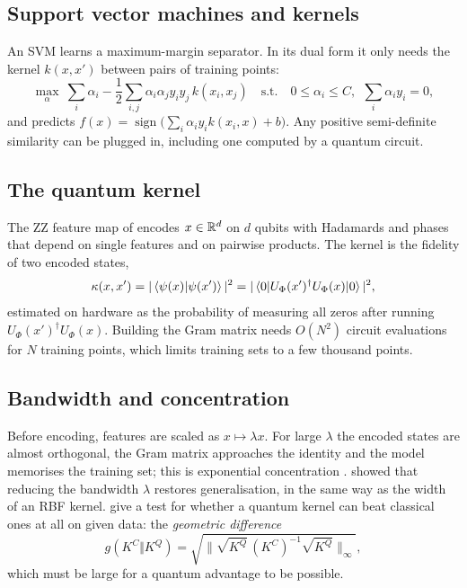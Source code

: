 \documentclass[11pt,a4paper]{article}
\begin{document}
\subsection{Support vector machines and kernels}
An SVM \citep{cortes1995} learns a maximum-margin separator. In its dual form it only needs the
kernel $k(x,x')$ between pairs of training points:
\begin{equation}
  \max_{\alpha}\ \sum_i\alpha_i-\frac12\sum_{i,j}\alpha_i\alpha_jy_iy_j\,k(x_i,x_j)
  \quad\text{s.t.}\quad 0\le\alpha_i\le C,\ \ \sum_i\alpha_iy_i=0,
\end{equation}
and predicts $f(x)=\operatorname{sign}\big(\sum_i\alpha_iy_ik(x_i,x)+b\big)$. Any positive
semi-definite similarity can be plugged in, including one computed by a quantum circuit.

\subsection{The quantum kernel}
The ZZ feature map of \citet{havlicek2019} encodes $x\in\mathbb{R}^d$ on $d$ qubits with Hadamards and
phases that depend on single features and on pairwise products. The kernel is the fidelity of two
encoded states,
\begin{equation}
  \kappa(x,x')=|\braket{\psi(x)|\psi(x')}|^2=|\braket{0|U_\Phi(x')^\dagger U_\Phi(x)|0}|^2,
\end{equation}
estimated on hardware as the probability of measuring all zeros after running
$U_\Phi(x')^\dagger U_\Phi(x)$. Building the Gram matrix needs $O(N^2)$ circuit evaluations for
$N$ training points, which limits training sets to a few thousand points.

\subsection{Bandwidth and concentration}
Before encoding, features are scaled as $x\mapsto\lambda x$. For large $\lambda$ the encoded states
are almost orthogonal, the Gram matrix approaches the identity and the model memorises the training
set; this is exponential concentration \citep{thanasilp2024}. \citet{shaydulin2022} showed that
reducing the bandwidth $\lambda$ restores generalisation, in the same way as the width of an RBF
kernel. \citet{huang2021power} give a test for whether a quantum kernel can beat classical ones at
all on given data: the \emph{geometric difference}
\begin{equation}
  g(K^{C}\Vert K^{Q})=\sqrt{\big\lVert\sqrt{K^{Q}}\,(K^{C})^{-1}\sqrt{K^{Q}}\big\rVert_\infty},
\end{equation}
which must be large for a quantum advantage to be possible.
\end{document}
